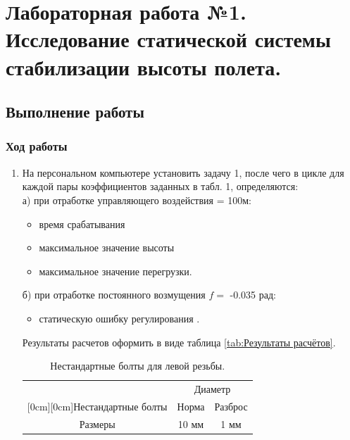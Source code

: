 \documentclass[a4paper,12pt]{article}
\begin{document}
\section{Лабораторная работа №1. Исследование статической системы стабилизации высоты полета.}
\subsection{Выполнение работы}
    \subsubsection{Ход работы}
    
    \begin{enumerate}
    \item На персональном компьютере установить задачу 1, после чего в цикле для
    каждой   пары   коэффициентов  заданных   в  табл.   1,
    определяются:\\
    а)	при отработке управляющего воздействия  = 100м:
        \begin{itemize}
            \item время срабатывания   
            \item максимальное значение высоты  
            \item максимальное значение перегрузки.
        \end{itemize}
    б)	при отработке постоянного возмущения $f=$ -0.035 рад:
        \begin{itemize}
            \item статическую ошибку регулирования .
        \end{itemize}
    
    Результаты расчетов оформить в виде таблица \ref{tab:Результаты расчётов}.

    \begin{table}[H]
        \caption{\label{tab:bolts} Нестандартные болты для левой резьбы.}
        \begin{center}
            \begin{tabular}{|c|c|c|}
            \hline
            & \multicolumn{2}{c|}{Диаметр} \\
            \cline{2-3}
            \raisebox{1.5ex}[0cm][0cm]{Нестандартные болты}
            & Норма & Разброс \\
            \hline
            Размеры & 10 мм & 1 мм \\
            \hline
            \end{tabular}
        \end{center}
    \end{table}
    

\end{enumerate}
\end{document}
